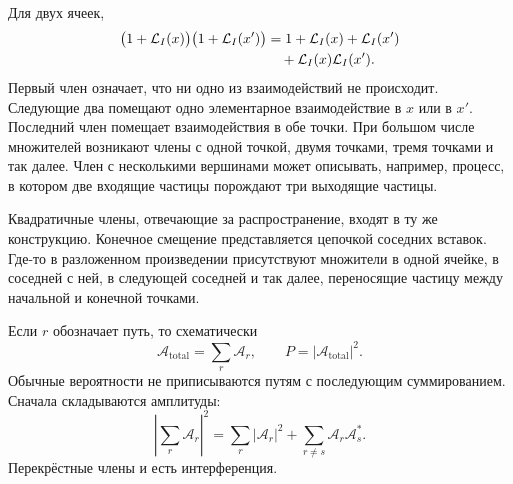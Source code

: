 Для двух ячеек,
\begin{align}
\bigl(1+\mathcal L_I(x)\bigr)
\bigl(1+\mathcal L_I(x')\bigr)
&=
1+\mathcal L_I(x)+\mathcal L_I(x')
\notag\\
&\quad{}+\mathcal L_I(x)\mathcal L_I(x').
\end{align}
Первый член означает, что ни одно из взаимодействий не происходит. Следующие два помещают одно элементарное взаимодействие в \(x\) или в \(x'\). Последний член помещает взаимодействия в обе точки. При большом числе множителей возникают члены с одной точкой, двумя точками, тремя точками и так далее. Член с несколькими вершинами может описывать, например, процесс, в котором две входящие частицы порождают три выходящие частицы.

Квадратичные члены, отвечающие за распространение, входят в ту же конструкцию. Конечное смещение представляется цепочкой соседних вставок. Где-то в разложенном произведении присутствуют множители в одной ячейке, в соседней с ней, в следующей соседней и так далее, переносящие частицу между начальной и конечной точками.

\begin{classroomqa}
\end{classroomqa}

Если \(r\) обозначает путь, то схематически
\begin{equation}
\mathcal A_{\mathrm{total}}=\sum_r\mathcal A_r,
\qquad
P=\left|\mathcal A_{\mathrm{total}}\right|^2.
\end{equation}
Обычные вероятности не приписываются путям с последующим суммированием. Сначала складываются амплитуды:
\begin{equation}
\left|\sum_r\mathcal A_r\right|^2
=
\sum_r|\mathcal A_r|^2
+
\sum_{r\ne s}\mathcal A_r\mathcal A_s^*.
\end{equation}
Перекрёстные члены и есть интерференция.

\begin{classroomqa}
\end{classroomqa}

